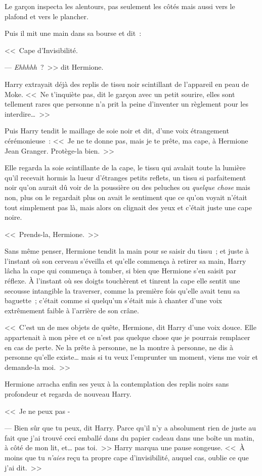Le garçon inspecta les alentours, pas seulement les côtés mais aussi vers le plafond et vers le plancher.

Puis il mit une main dans sa bourse et dit~:

<<~Cape d'Invisibilité.

--- \emph{Ehhhhh}~?~>> dit Hermione.

Harry extrayait déjà des replis de tissu noir scintillant de l'appareil en peau de Moke. <<~Ne t'inquiète pas, dit le garçon avec un petit sourire, elles sont tellement rares que personne n'a prit la peine d'inventer un règlement pour les interdire…~>>

Puis Harry tendit le maillage de soie noir et dit, d'une voix étrangement cérémonieuse~: <<~Je ne te donne pas, mais je te prête, ma cape, à Hermione Jean Granger. Protège-la bien.~>>

Elle regarda la soie scintillante de la cape, le tissu qui avalait toute la lumière qu'il recevait hormis la lueur d'étranges petits reflets, un tissu si parfaitement noir qu'on aurait dû voir de la poussière ou des peluches ou \emph{quelque chose} mais non, plus on le regardait plus on avait le sentiment que ce qu'on voyait n'était tout simplement pas là, mais alors on clignait des yeux et c'était juste une cape noire.

<<~Prends-la, Hermione.~>>

Sans même penser, Hermione tendit la main pour se saisir du tissu~; et juste à l'instant où son cerveau s'éveilla et qu'elle commença à retirer sa main, Harry lâcha la cape qui commença à tomber, si bien que Hermione s'en saisit par réflexe. À l'instant où ses doigts touchèrent et tinrent la cape elle sentit une secousse intangible la traverser, comme la première fois qu'elle avait tenu sa baguette~; c'était comme si quelqu'un s'était mis à chanter d'une voix extrêmement faible à l'arrière de son crâne.

<<~C'est un de mes objets de quête, Hermione, dit Harry d'une voix douce. Elle appartenait à mon père et ce n'est pas quelque chose que je pourrais remplacer en cas de perte. Ne la prête à personne, ne la montre à personne, ne dis à personne qu'elle existe… mais si tu veux l'emprunter un moment, viens me voir et demande-la moi.~>>

Hermione arracha enfin ses yeux à la contemplation des replis noirs sans profondeur et regarda de nouveau Harry.

<<~Je ne peux pas -

--- Bien sûr que tu peux, dit Harry. Parce qu'il n'y a absolument rien de juste au fait que j'ai trouvé ceci emballé dans du papier cadeau dans une boîte un matin, à côté de mon lit, et… pas toi.~>> Harry marqua une pause songeuse. <<~À moins que tu \emph{n'aies} reçu ta propre cape d'invisibilité, auquel cas, oublie ce que j'ai dit.~>>

